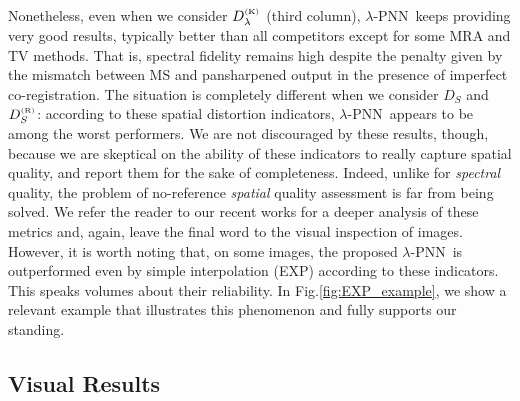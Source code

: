 \documentclass[journal]{IEEEtran}
\newcommand{\DL} {D^{_{\rm (K)}}_\lambda}
\newcommand{\DS} {D_{S}}
\newcommand{\DSR}{D^{_{\rm (R)}}_S}
\newcommand{\LPNN}  {$\lambda$-PNN}
\begin{document}
Nonetheless, even when we consider $\DL$ (third column),
\LPNN\ keeps providing very good results, typically better than all competitors except for some MRA and TV methods.
That is, spectral fidelity remains high despite the penalty given by the mismatch between MS and pansharpened output
in the presence of imperfect co-registration.
The situation is completely different when we consider $\DS$ and $\DSR$:
according to these spatial distortion indicators, \LPNN\ appears to be among the worst performers.
We are not discouraged by these results, though,
because we are skeptical on the ability of these indicators to really capture spatial quality, and report them for the sake of completeness.
Indeed, unlike for {\em spectral} quality, the problem of no-reference {\em spatial} quality assessment is far from being solved.
We refer the reader to our recent works \cite{Ciotola2022,Scarpa2022a} for a deeper analysis of these metrics and,
again, leave the final word to the visual inspection of images.
However, it is worth noting that, on some images, the proposed \LPNN\ is outperformed even by simple interpolation (EXP) according to these indicators.
This speaks volumes about their reliability.
In Fig.\ref{fig:EXP_example}, we show a relevant example that illustrates this phenomenon and fully supports our standing.


\subsection{Visual Results}

\newcommand{\ssiz}[1]{{\scriptsize #1}}
\newcommand{\best}[1]{{\scriptsize Best #1}}

\newcommand{\imAx}[1]{\texttt{[image: ./png\_comp/WV3/Adelaide/\#1.jpg]}}
\newcommand{\imPx}[1]{\texttt{[image: ./png\_comp/WV3/PairMax/\#1.jpg]}}
\newcommand{\imWy}[1]{\texttt{[image: ./png\_comp/WV2/Washington/\#1.jpg]}}
\newcommand{\imPy}[1]{\texttt{[image: ./png\_comp/WV2/PairMax/\#1.jpg]}}
\newcommand{\imGz}[1]{\texttt{[image: ./png\_comp/GE1/Genova/\#1.jpg]}}
\newcommand{\imPz}[1]{\texttt{[image: ./png\_comp/GE1/PairMax/\#1.jpg]}}
\end{document}
